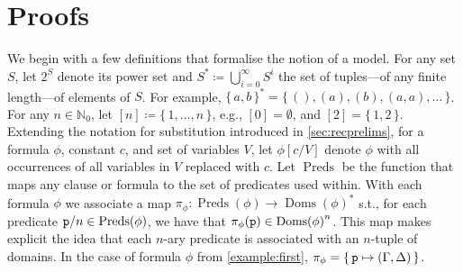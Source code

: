 \documentclass{article}
\newcommand{\predicate}{\texttt{\textup{p}}}
\DeclareMathOperator{\Doms}{Doms}
\DeclareMathOperator{\Preds}{Preds}
\begin{document}
\appendix

\section{Proofs}

We begin with a few definitions that formalise the notion of a model. For any
set $S$, let $2^{S}$ denote its power set and
$S^{\ast} \coloneqq \bigcup_{i=0}^{\infty} S^{i}$ the set of tuples---of any
finite length---of elements of $S$. For example,
${\{\,a, b\,\}}^{\ast} = \{\, (), (a), (b), (a, a), \dots \,\}$. For any
$n \in \mathbb{N}_{0}$, let $[n] \coloneqq \{\, 1, \dots, n \,\}$, e.g.,
$[0] = \emptyset$, and $[2] = \{\, 1, 2 \,\}$. Extending the notation for
substitution introduced in \cref{sec:recprelims}, for a formula $\phi$, constant
$c$, and set of variables $V$, let $\phi[c/V]$ denote $\phi$ with all
occurrences of all variables in $V$ replaced with $c$. Let $\Preds$ be the
function that maps any clause or formula to the set of predicates used within.
With each formula $\phi$ we associate a map
$\pi_{\phi}\colon \Preds(\phi) \to {\Doms(\phi)}^{\ast}$ s.t., for each
predicate $\predicate/n \in \Preds(\phi)$, we have that
$\pi_{\phi}(\predicate) \in {\Doms(\phi)}^{n}$. This map makes explicit the idea
that each $n$-ary predicate is associated with an $n$-tuple of domains. In the
case of formula $\phi$ from \cref{example:first},
$\pi_{\phi} = \{\, \predicate \mapsto (\Gamma, \Delta) \,\}$.
\end{document}
